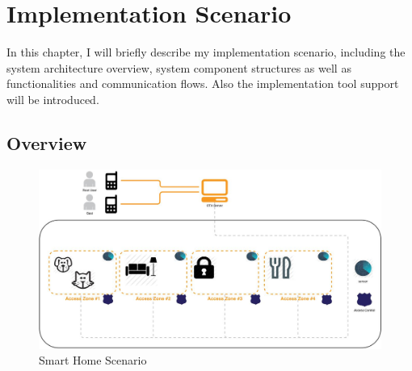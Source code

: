 \chapter{Implementation Scenario}

In this chapter, I will briefly describe my implementation scenario, including the system architecture overview, system component structures as well as functionalities and communication flows. Also the implementation tool support will be introduced.
\section{Overview}
 \begin{figure}[!htb]
	\centering
	\includegraphics[width=1\textwidth]{homeoverview.jpg}
		\caption{Smart Home Scenario}
	\label{fig:SmartHome}
\end{figure}

